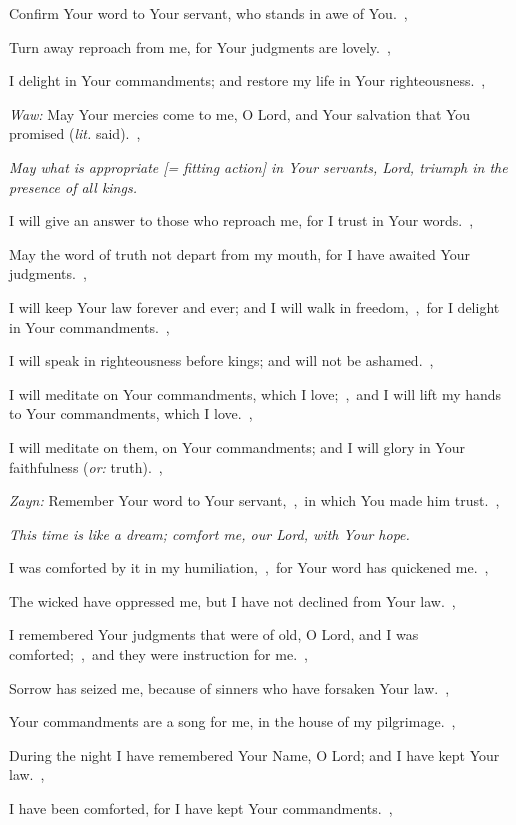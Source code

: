 \documentclass[12pt,twoside,a5paper]{article}
\newcommand{\qanona}[1]{{\liturgicalhint{Qanona.} \emph{#1}}}
\newcommand{\translationoption}[1]{\emph{or:} #1}
\newcommand{\translationliteral}[1]{\emph{lit.} #1}
\begin{document}
\begin{normalparskip}
  Confirm Your word to Your servant, who stands in awe of You.~\sep

  Turn away reproach from me, for Your judgments are lovely.~\sep

  I delight in Your commandments; and restore my life in Your righteousness.~\sep

  \emph{Waw:} May Your mercies come to me, O Lord, and Your salvation that You promised (\translationliteral{said}).~\sep

  \qanona{May what is appropriate [= fitting action] in Your servants, Lord, triumph in the presence of all kings.}

  I will give an answer to those who reproach me, for I trust in Your words.~\sep

  May the word of truth not depart from my mouth, for I have awaited Your judgments.~\sep

  I will keep Your law forever and ever; and I will walk in freedom,~\sep\ for I delight in Your commandments.~\sep

  I will speak in righteousness before kings; and will not be ashamed.~\sep

  I will meditate on Your commandments, which I love;~\sep\ and I will lift my hands to Your commandments, which I love.~\sep

  I will meditate on them, on Your commandments; and I will glory in Your faithfulness (\translationoption{truth}).~\sep

  \emph{Zayn:} Remember Your word to Your servant,~\sep\ in which You made him trust.~\sep

  \qanona{This time is like a dream; comfort me, our Lord, with Your hope.}

  I was comforted by it in my humiliation,~\sep\ for Your word has quickened me.~\sep

  The wicked have oppressed me, but I have not declined from Your law.~\sep

  I remembered Your judgments that were of old, O Lord, and I was comforted;~\sep\ and they were instruction for me.~\sep

  Sorrow has seized me, because of sinners who have forsaken Your law.~\sep

  Your commandments are a song for me, in the house of my pilgrimage.~\sep

  During the night I have remembered Your Name, O Lord; and I have kept Your law.~\sep

  I have been comforted, for I have kept Your commandments.~\sep


\end{normalparskip}
\end{document}
